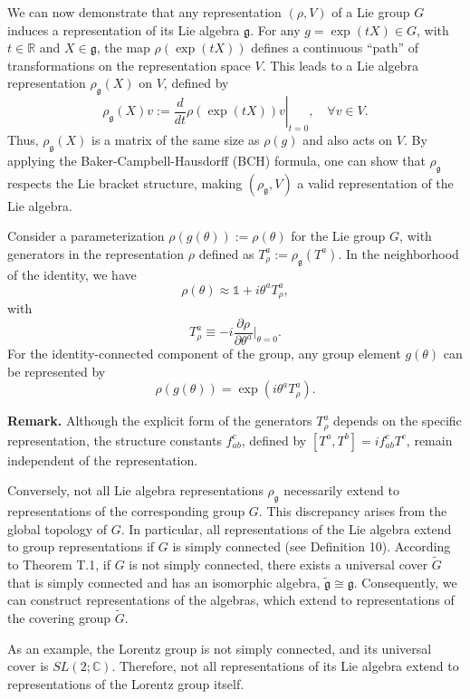 We can now demonstrate that any representation $(\rho, V)$ of a Lie group $G$ induces a representation of its Lie algebra $\mathfrak{g}$. For any $g = \exp(tX) \in G$, with $t \in \mathbb{R}$ and $X \in \mathfrak{g}$, the map $\rho(\exp(tX))$ defines a continuous “path” of transformations on the representation space $V$. This leads to a Lie algebra representation $\rho_\mathfrak{g}(X)$ on $V$, defined by
\[
\rho_\mathfrak{g}(X)v := \left. \frac{d}{dt} \rho(\exp(tX))v \right|_{t=0}, \quad \forall v \in V.
\]
Thus, $\rho_\mathfrak{g}(X)$ is a matrix of the same size as $\rho(g)$ and also acts on $V$. By applying the Baker-Campbell-Hausdorff (BCH) formula, one can show that $\rho_\mathfrak{g}$ respects the Lie bracket structure, making $(\rho_\mathfrak{g}, V)$ a valid representation of the Lie algebra.

Consider a parameterization $\rho(g(\theta)) := \rho(\theta)$ for the Lie group $G$, with generators in the representation $\rho$ defined as $T^a_\rho := \rho_\mathfrak{g}(T^a)$. In the neighborhood of the identity, we have
\[
\rho(\theta) \approx \mathbb{1} + i \theta^a T^a_\rho,
\]
with
\[
T^a_\rho \equiv -i \frac{\partial \rho}{\partial \theta^a} \bigg|_{\theta=0}.
\]
For the identity-connected component of the group, any group element $g(\theta)$ can be represented by
\[
\rho(g(\theta)) = \exp(i \theta^a T^a_\rho).
\]

\noindent
\textbf{Remark.} Although the explicit form of the generators $T^a_\rho$ depends on the specific representation, the structure constants $f^c_{ab}$, defined by $[T^a, T^b] = i f^c_{ab} T^c$, remain independent of the representation.

Conversely, not all Lie algebra representations $\rho_\mathfrak{g}$ necessarily extend to representations of the corresponding group $G$. This discrepancy arises from the global topology of $G$. In particular, all representations of the Lie algebra extend to group representations if $G$ is simply connected (see Definition 10). According to Theorem T.1, if $G$ is not simply connected, there exists a universal cover $\tilde{G}$ that is simply connected and has an isomorphic algebra, $\tilde{\mathfrak{g}} \cong \mathfrak{g}$. Consequently, we can construct representations of the algebras, which extend to representations of the covering group $\tilde{G}$.

As an example, the Lorentz group is not simply connected, and its universal cover is $SL(2; \mathbb{C})$. Therefore, not all representations of its Lie algebra extend to representations of the Lorentz group itself.

